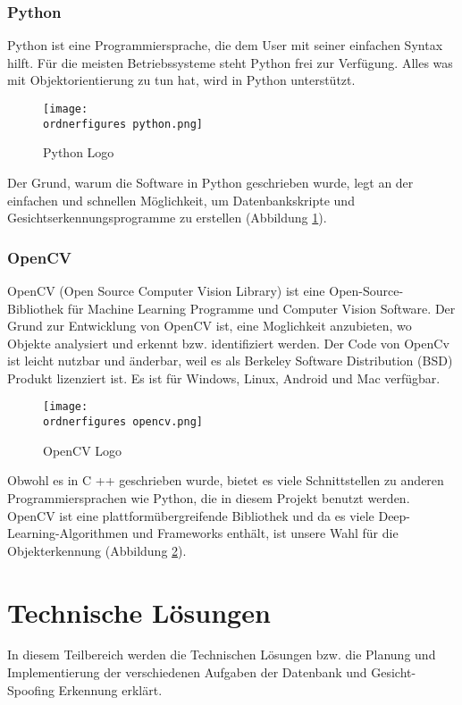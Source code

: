 \subsubsection{Python}
Python ist eine Programmiersprache, die dem User mit seiner einfachen Syntax hilft. Für die meisten Betriebssysteme steht Python frei zur Verfügung. Alles was mit Objektorientierung zu tun hat, wird in Python unterstützt.\cite{pythonInfo}
\begin{figure}[ht]
	\centering
	\texttt{[image: \\ordnerfigures python.png]}
	\caption{ Python Logo \cite{Pythonlogo}}
	\label{fig:python}
\end{figure}
\bigbreak
Der Grund, warum die Software in Python geschrieben wurde, legt an der einfachen und schnellen Möglichkeit, um Datenbankskripte und Gesichtserkennungsprogramme zu erstellen (Abbildung \ref{fig:python}).
\subsubsection{OpenCV}
OpenCV (Open Source Computer Vision Library) ist eine Open-Source-Bibliothek für Machine Learning Programme und Computer Vision Software. Der Grund zur Entwicklung von OpenCV ist, eine Moglichkeit anzubieten, wo Objekte analysiert und erkennt bzw. identifiziert werden. Der Code von OpenCv ist leicht nutzbar und änderbar, weil es als Berkeley Software Distribution (BSD) Produkt lizenziert ist. Es ist für Windows, Linux, Android und Mac verfügbar.\cite{OpenCV1}
\begin{figure}[ht]
	\centering
	\texttt{[image: \\ordnerfigures opencv.png]}
	\caption{ OpenCV Logo \cite{OpenCVlogo}}
	\label{fig:opencv}
\end{figure}
\bigbreak
Obwohl es in C ++ geschrieben wurde, bietet es viele Schnittstellen zu anderen Programmiersprachen wie Python, die in diesem Projekt benutzt werden. OpenCV ist eine plattformübergreifende Bibliothek und da es viele Deep-Learning-Algorithmen und Frameworks enthält, ist unsere Wahl für die Objekterkennung (Abbildung \ref{fig:opencv}).
\newpage
\section{Technische Lösungen}
In diesem Teilbereich werden die Technischen Lösungen bzw. die Planung und Implementierung der verschiedenen Aufgaben der Datenbank und Gesicht-Spoofing Erkennung erklärt.
